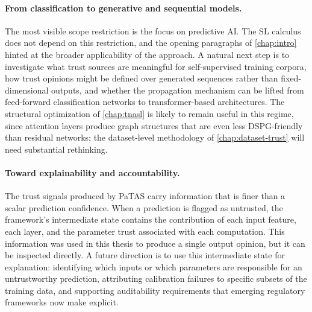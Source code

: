 \paragraph{From classification to generative and sequential models.} The most visible scope restriction is the focus on predictive \ac{AI}. The \ac{SL} calculus does not depend on this restriction, and the opening paragraphs of \cref{chap:intro} hinted at the broader applicability of the approach. A natural next step is to investigate what trust sources are meaningful for self-supervised training corpora, how trust opinions might be defined over generated sequences rather than fixed-dimensional outputs, and whether the propagation mechanism can be lifted from feed-forward classification networks to transformer-based architectures. The structural optimization of \cref{chap:tnasl} is likely to remain useful in this regime, since attention layers produce graph structures that are even less DSPG-friendly than residual networks; the dataset-level methodology of \cref{chap:dataset-trust} will need substantial rethinking.

\paragraph{Toward explainability and accountability.} The trust signals produced by PaTAS carry information that is finer than a scalar prediction confidence. When a prediction is flagged as untrusted, the framework's intermediate state contains the contribution of each input feature, each layer, and the parameter trust associated with each computation. This information was used in this thesis to produce a single output opinion, but it can be inspected directly. A future direction is to use this intermediate state for explanation: identifying which inputs or which parameters are responsible for an untrustworthy prediction, attributing calibration failures to specific subsets of the training data, and supporting auditability requirements that emerging regulatory frameworks now make explicit.

